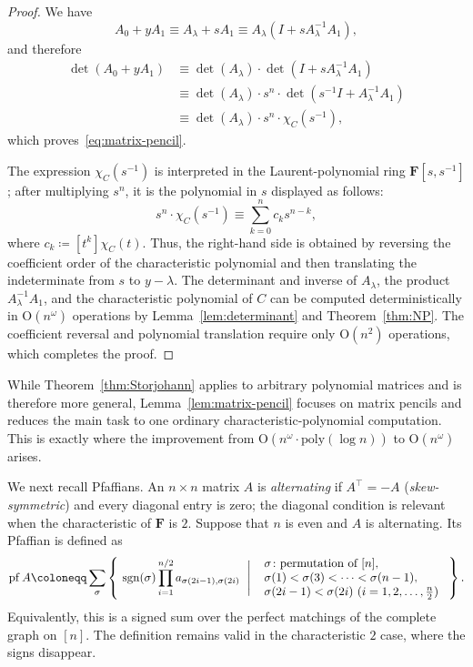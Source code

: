 \documentclass[11pt, a4paper]{article}
\theoremstyle{plain}
\theoremstyle{definition}
\theoremstyle{remark}
\newcommand{\bF}{\mathbf{F}}
\DeclareMathOperator{\pf}{pf}
\begin{document}
\begin{proof}
We have
\[A_0+yA_1\equiv A_\lambda+sA_1\equiv A_\lambda(I+sA_\lambda^{-1}A_1),\]
and therefore
\begin{align*}
\det(A_0+yA_1)
 &\equiv\det(A_\lambda)\cdot\det(I+sA_\lambda^{-1}A_1)\\
 &\equiv\det(A_\lambda)\cdot s^n \cdot\det(s^{-1}I+A_\lambda^{-1}A_1)\\
 &\equiv\det(A_\lambda)\cdot s^n \cdot\chi_C(s^{-1}),
\end{align*}
which proves~\eqref{eq:matrix-pencil}.

The expression $\chi_C(s^{-1})$ is interpreted in the Laurent-polynomial ring $\bF[s,s^{-1}]$; after multiplying $s^n$, it is the polynomial in $s$ displayed as follows:
\[s^n \cdot \chi_C(s^{-1})\equiv\sum_{k=0}^n c_k s^{n-k},\]
where $c_k \coloneqq [t^k]\chi_C(t)$.
Thus, the right-hand side is obtained by reversing the coefficient order of the characteristic polynomial and then translating the indeterminate from $s$ to $y-\lambda$.
The determinant and inverse of $A_\lambda$, the product $A_\lambda^{-1}A_1$, and the characteristic polynomial of $C$ can be computed deterministically in $\mathrm{O}(n^\omega)$ operations by Lemma~\ref{lem:determinant} and Theorem~\ref{thm:NP}.
The coefficient reversal and polynomial translation require only $\mathrm{O}(n^2)$ operations, which completes the proof.
\end{proof}

While Theorem~\ref{thm:Storjohann} applies to arbitrary polynomial matrices and is therefore more general, Lemma~\ref{lem:matrix-pencil} focuses on matrix pencils and reduces the main task to one ordinary characteristic-polynomial computation.
This is exactly where the improvement from $\mathrm{O}(n^\omega \cdot \mathrm{poly}(\log n))$ to $\mathrm{O}(n^\omega)$ arises.

We next recall Pfaffians.
An $n\times n$ matrix $A$ is \emph{alternating} if $A^\top=-A$ (\emph{skew-symmetric}) and every diagonal entry is zero; the diagonal condition is relevant when the characteristic of $\mathbf{F}$ is $2$.
Suppose that $n$ is even and $A$ is alternating.
Its Pfaffian is defined as
\begin{align*}
\pf A \coloneqq \sum_{\sigma} \left\{\ \mathrm{sgn}(\sigma)\prod_{i=1}^{n/2} a_{\sigma(2i - 1), \sigma(2i)} \ \Biggm| \ \begin{array}{ll}\sigma \colon \text{permutation of $[n]$},\\[0mm] \sigma(1) < \sigma(3) < \cdots < \sigma(n - 1),\\[0mm] \sigma(2i - 1) < \sigma(2i) \ (i = 1, 2, \dots, \frac{n}{2}) \end{array} \ \right\}.
\end{align*}
Equivalently, this is a signed sum over the perfect matchings of the complete graph on $[n]$.
The definition remains valid in the characteristic $2$ case, where the signs disappear.
\end{document}

